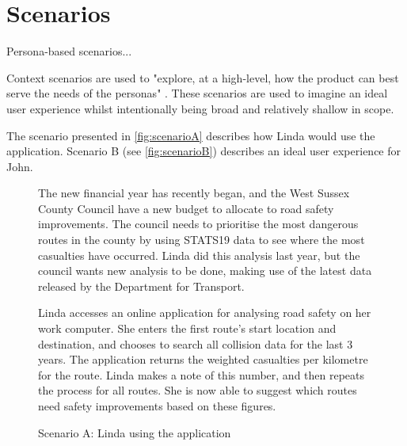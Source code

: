 \documentclass[authoryearcitations]{UoYCSproject}
\begin{document}
\section{Scenarios}

Persona-based scenarios...

Context scenarios are used to "explore, at a high-level, how the product can best serve the needs of the personas" \citep{Cooper2007}. These scenarios are used to imagine an ideal user experience whilst intentionally being broad and relatively shallow in scope.

The scenario presented in \autoref{fig:scenarioA} describes how Linda would use the application. Scenario B (see \autoref{fig:scenarioB}) describes an ideal user experience for John.

\begin{figure}
	\begin{framed}
		The new financial year has recently began, and the West Sussex County Council have a new budget to allocate to road safety improvements. The council needs to prioritise the most dangerous routes in the county by using STATS19 data to see where the most casualties have occurred. Linda did this analysis last year, but the council wants new analysis to be done, making use of the latest data released by the Department for Transport.
		
		Linda accesses an online application for analysing road safety on her work computer. She enters the first route's start location and destination, and chooses to search all collision data for the last 3 years. The application returns the weighted casualties per kilometre for the route. Linda makes a note of this number, and then repeats the process for all routes. She is now able to suggest which routes need safety improvements based on these figures.
  	\end{framed}
  \caption{Scenario A: Linda using the application}
  \label{fig:scenarioA}
\end{figure}
\end{document}
